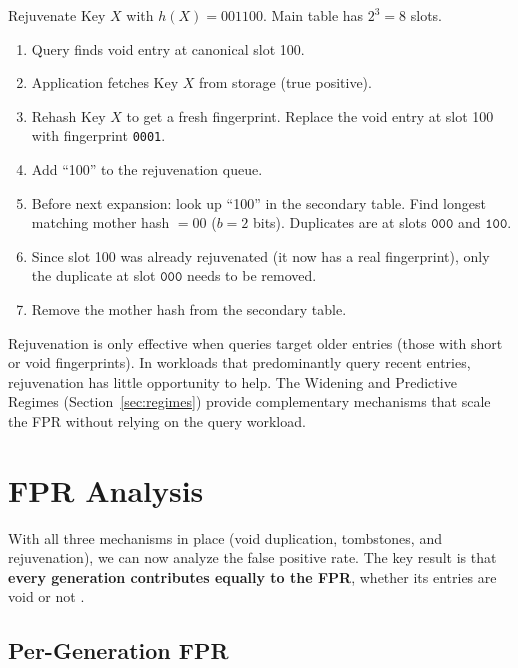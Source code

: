 \begin{examplebox}
Rejuvenate Key $X$ with $h(X) = 001100$. Main table has $2^3 = 8$ 
slots.

\begin{enumerate}
  \item Query finds void entry at canonical slot 100.
  \item Application fetches Key $X$ from storage (true positive).
  \item Rehash Key $X$ to get a fresh fingerprint. Replace the void 
        entry at slot 100 with fingerprint \texttt{0001}.
  \item Add ``100'' to the rejuvenation queue.
  \item Before next expansion: look up ``100'' in the secondary table. 
        Find longest matching mother hash $= 00$ ($b = 2$ bits). 
        Duplicates are at slots $\texttt{000}$ and $\texttt{100}$.
  \item Since slot 100 was already rejuvenated (it now has a real 
        fingerprint), only the duplicate at slot $\texttt{000}$ needs 
        to be removed.
  \item Remove the mother hash from the secondary table.
\end{enumerate}
\end{examplebox}

Rejuvenation is only effective when queries target older entries 
(those with short or void fingerprints). In workloads that 
predominantly query recent entries, rejuvenation has little 
opportunity to help. The Widening and Predictive Regimes 
(Section~\ref{sec:regimes}) provide complementary mechanisms that 
scale the FPR without relying on the query workload.


\section{FPR Analysis}
\label{sec:fpr-analysis}

With all three mechanisms in place (void duplication, tombstones, and 
rejuvenation), we can now analyze the false positive rate. The key 
result is that \textbf{every generation contributes equally to the 
FPR}, whether its entries are void or not \cite{aleph}.

\subsection{Per-Generation FPR}

